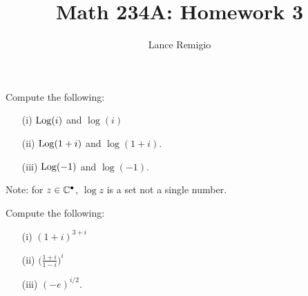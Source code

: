 \documentclass[a4paper]{article}
\title{Math 234A: Homework 3}
\author{Lance Remigio}
\begin{document}
\maketitle    
{}
\rhead{\thepage}

\begin{problem}
    Compute the following:
    \begin{enumerate}
        \item[(i)] \( \operatorname{Log}(i)  \) and \( \log(i) \)
        \item[(ii)] \( \operatorname{Log}(1+i)   \) and \( \log(1+i) \).
        \item[(iii)] \( \operatorname{Log}(-1)  \) and \( \log(-1) \).
    \end{enumerate}
    Note: for \( z \in \mathbb{C}^{\bullet} \), \( \log z  \) is a set not a single number.
\end{problem}

\begin{solution}
    
\end{solution}

\begin{problem}
   Compute the following: 
   \begin{enumerate}
       \item[(i)] \( (1 + i)^{3 +i} \)
        \item[(ii)] \( \Big(  \frac{ 1 + i  }{  1 - i  }  \Big)^{i} \)
        \item[(iii)] \( (-e)^{i/2} \).
   \end{enumerate}
\end{problem}
\begin{solution}

\end{solution}
\end{document}
